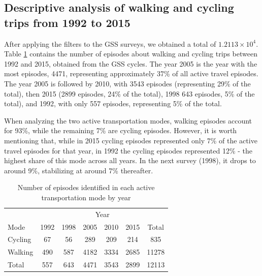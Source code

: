 \documentclass[preprint, 3p,
authoryear]{elsarticle} %
\begin{document}
\hypertarget{descriptive-analysis-of-walking-and-cycling-trips-from-1992-to-2015}{%
\subsection{Descriptive analysis of walking and cycling trips from 1992
to
2015}\label{descriptive-analysis-of-walking-and-cycling-trips-from-1992-to-2015}}

After applying the filters to the GSS surveys, we obtained a total of
\ensuremath{1.2113\times 10^{4}}. Table \ref{tab:table-01} contains the
number of episodes about walking and cycling trips between 1992 and
2015, obtained from the GSS cycles. The year 2005 is the year with the
most episodes, 4471, representing approximately 37\% of all active
travel episodes. The year 2005 is followed by 2010, with 3543 episodes
(representing 29\% of the total), then 2015 (2899 episodes, 24\% of the
total), 1998 643 episodes, 5\% of the total), and 1992, with only 557
episodes, representing 5\% of the total.

When analyzing the two active transportation modes, walking episodes
account for 93\%, while the remaining 7\% are cycling episodes. However,
it is worth mentioning that, while in 2015 cycling episodes represented
only 7\% of the active travel episodes for that year, in 1992 the
cycling episodes represented 12\% - the highest share of this mode
across all years. In the next survey (1998), it drops to around 9\%,
stabilizing at around 7\% thereafter.

\begingroup\fontsize{10}{12}\selectfont

\begin{longtable}[t]{lcccccc}
\caption{\label{tab:bulding table-01}\label{tab:table-01}Number of episodes identified in each active transportation mode by year}\\
\toprule
\multicolumn{1}{c}{ } & \multicolumn{6}{c}{Year} \\
\cmidrule(l{3pt}r{3pt}){2-7}
Mode & 1992 & 1998 & 2005 & 2010 & 2015 & Total\\
\midrule
Cycling & 67 & 56 & 289 & 209 & 214 & 835\\
Walking & 490 & 587 & 4182 & 3334 & 2685 & 11278\\
Total & 557 & 643 & 4471 & 3543 & 2899 & 12113\\
\bottomrule
\end{longtable}
\endgroup{}
\end{document}
